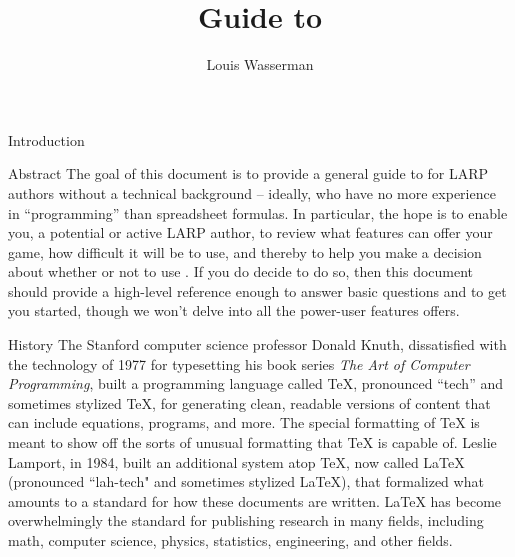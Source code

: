 \documentclass[sheet]{GameTexBase}
\title{Guide to \gametex{}}
\author{Louis Wasserman}
\begin{document}
\maketitle{}
\setcounter{tocdepth}{2}
\tableofcontents
\begin{section}{Introduction}
\begin{subsection}{Abstract}
The goal of this document is to provide a general guide to \gametex{} for LARP authors without a technical background -- ideally, who have no more experience in ``programming'' than spreadsheet formulas.  In particular, the hope is to enable you, a potential or active LARP author, to review what features \gametex{} can offer your game, how difficult it will be to use, and thereby to help you make a decision about whether or not to use \gametex{}.  If you do decide to do so, then this document should provide a high-level reference enough to answer basic questions and to get you started, though we won't delve into all the power-user features \gametex{} offers.

\end{subsection}
\begin{subsection}{History}
The Stanford computer science professor Donald Knuth, dissatisfied with the technology of 1977 for typesetting his book series \textit{The Art of Computer Programming}, built a programming language called TeX,
pronounced ``tech'' and sometimes stylized \TeX{}, for generating clean, readable versions of content that can include equations, programs, and more.  The special formatting of \TeX{} is 
meant to show off the sorts of unusual formatting that \TeX{} is capable of.
Leslie Lamport, in 1984, built an additional system atop \TeX{}, now called LaTeX (pronounced ``lah-tech" and sometimes stylized \LaTeX{}), that formalized what amounts to a standard for how these documents are written.  LaTeX has become overwhelmingly the standard for publishing research in many fields, including math, computer science, physics, statistics, engineering, and other fields.


\end{subsection}
\end{section}
\end{document}
